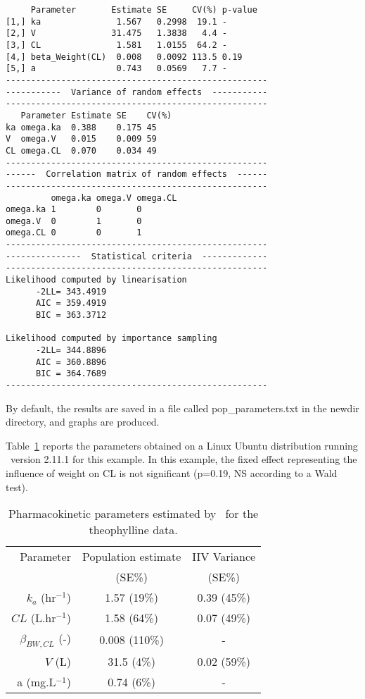 \begin{verbatim}
     Parameter       Estimate SE     CV(%) p-value
[1,] ka               1.567   0.2998  19.1 -      
[2,] V               31.475   1.3838   4.4 -      
[3,] CL               1.581   1.0155  64.2 -      
[4,] beta_Weight(CL)  0.008   0.0092 113.5 0.19   
[5,] a                0.743   0.0569   7.7 -      
----------------------------------------------------
-----------  Variance of random effects  -----------
----------------------------------------------------
   Parameter Estimate SE    CV(%)
ka omega.ka  0.388    0.175 45   
V  omega.V   0.015    0.009 59   
CL omega.CL  0.070    0.034 49   
----------------------------------------------------
------  Correlation matrix of random effects  ------
----------------------------------------------------
         omega.ka omega.V omega.CL
omega.ka 1        0       0       
omega.V  0        1       0       
omega.CL 0        0       1       
----------------------------------------------------
---------------  Statistical criteria  -------------
----------------------------------------------------
Likelihood computed by linearisation
      -2LL= 343.4919 
      AIC = 359.4919 
      BIC = 363.3712 

Likelihood computed by importance sampling
      -2LL= 344.8896 
      AIC = 360.8896 
      BIC = 364.7689 
----------------------------------------------------
\end{verbatim}
By default, the results are saved in a file called {\sf pop\_parameters.txt} in the {\sf newdir} directory, and graphs are produced.

Table~\ref{tab:paramtheo} reports the parameters obtained on a Linux Ubuntu distribution running \R~version 2.11.1 for this example. In this example, the fixed effect representing the influence of weight on CL is not significant (p=0.19, NS according to a Wald test).
\begin{table}[!h]
\begin{center}
\begin{tabular}{r c c}
\hline
Parameter & Population estimate & IIV Variance \\
& (SE\%) & (SE\%) \\
\hline
$k_{a}$ (hr$^{-1}$) & 1.57 (19\%) & 0.39 (45\%)\\
$CL$ (L.hr$^{-1}$) & 1.58 (64\%) & 0.07 (49\%) \\ 
$\beta_{BW,CL}$ (-) & 0.008 (110\%) & - \\
$V$ (L) & 31.5 (4\%) & 0.02 (59\%) \\
a (mg.L$^{-1}$) & 0.74 (6\%) & - \\
\hline
\end{tabular} 
\caption{Pharmacokinetic parameters estimated by \monolix~for the theophylline data.} \label{tab:paramtheo}
\end{center}
\end{table}

